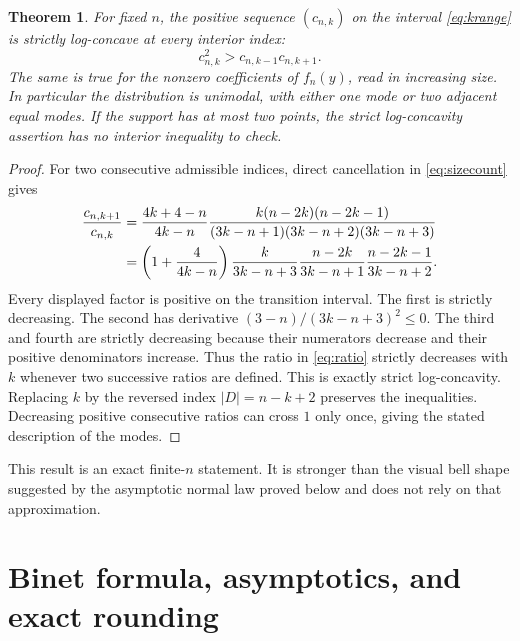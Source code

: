 \documentclass[11pt,letterpaper]{article}
\numberwithin{equation}{section}
\newtheorem{theorem}{Theorem}[section]
\theoremstyle{definition}
\newcommand{\1}{\mathbf 1}
\begin{document}
\begin{theorem}\label{thm:logconcavity}
For fixed $n$, the positive sequence $(c_{n,k})$ on the interval
\eqref{eq:krange} is strictly log-concave at every interior index:
\begin{equation}\label{eq:logconcavity}
 c_{n,k}^2>c_{n,k-1}c_{n,k+1}.
\end{equation}
The same is true for the nonzero coefficients of $f_n(y)$, read in increasing
size. In particular the distribution is unimodal, with either one mode or
two adjacent equal modes. If the support has at most two points, the strict
log-concavity assertion has no interior inequality to check.
\end{theorem}
\begin{proof}
For two consecutive admissible indices, direct cancellation in
\eqref{eq:sizecount} gives
\begin{align}\label{eq:ratio}
 \frac{c_{n,k+1}}{c_{n,k}}
 &=\frac{4k+4-n}{4k-n}
   \frac{k(n-2k)(n-2k-1)}
   {(3k-n+1)(3k-n+2)(3k-n+3)}\\
 &=\left(1+\frac4{4k-n}\right)
   \frac{k}{3k-n+3}
   \frac{n-2k}{3k-n+1}
   \frac{n-2k-1}{3k-n+2}.\notag
\end{align}
Every displayed factor is positive on the transition interval. The first is
strictly decreasing. The second has derivative
$(3-n)/(3k-n+3)^2\le0$. The third and fourth are strictly decreasing because
their numerators decrease and their positive denominators increase.
Thus the ratio in \eqref{eq:ratio} strictly decreases with $k$ whenever two
successive ratios are defined. This is exactly strict log-concavity.
Replacing $k$ by the reversed index $|D|=n-k+2$ preserves the inequalities.
Decreasing positive consecutive ratios can cross $1$ only once, giving the
stated description of the modes.
\end{proof}
This result is an exact finite-$n$ statement. It is stronger than the visual
bell shape suggested by the asymptotic normal law proved below and does not
rely on that approximation.

\section{Binet formula, asymptotics, and exact rounding}\label{sec:asymptotic}
\end{document}
